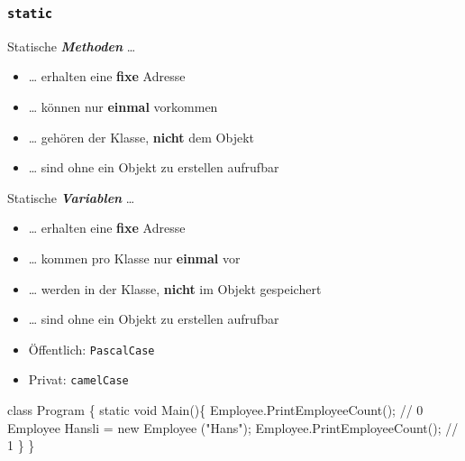 \documentclass[
  9pt,
  a4paperpaper,
  DIV=11]{scrartcl}
\newenvironment{Shaded}{}{}
\newcommand{\CommentTok}[1]{\textcolor[rgb]{0.42,0.45,0.49}{#1}}
\newcommand{\DataTypeTok}[1]{\textcolor[rgb]{0.84,0.23,0.29}{#1}}
\newcommand{\FunctionTok}[1]{\textcolor[rgb]{0.44,0.26,0.76}{#1}}
\newcommand{\KeywordTok}[1]{\textcolor[rgb]{0.84,0.23,0.29}{#1}}
\newcommand{\NormalTok}[1]{\textcolor[rgb]{0.14,0.16,0.18}{#1}}
\newcommand{\OperatorTok}[1]{\textcolor[rgb]{0.14,0.16,0.18}{#1}}
\newcommand{\StringTok}[1]{\textcolor[rgb]{0.01,0.18,0.38}{#1}}
\providecommand{\tightlist}{%
  \setlength{\itemsep}{0pt}\setlength{\parskip}{0pt}}\usepackage{longtable,booktabs,array}
\numberwithin{equation}{section}
\begin{document}
\begin{multicols}{2}
\hypertarget{static}{%
\subsubsection{\texorpdfstring{\texttt{static}}{static}}\label{static}}

Statische \textbf{\emph{Methoden}} \ldots{}

\begin{itemize}
\tightlist
\item
  \ldots{} erhalten eine \textbf{fixe} Adresse
\item
  \ldots{} können nur \textbf{einmal} vorkommen
\item
  \ldots{} gehören der Klasse, \textbf{nicht} dem Objekt
\item
  \ldots{} sind ohne ein Objekt zu erstellen aufrufbar
\end{itemize}

Statische \textbf{\emph{Variablen}} \ldots{}

\begin{itemize}
\tightlist
\item
  \ldots{} erhalten eine \textbf{fixe} Adresse
\item
  \ldots{} kommen pro Klasse nur \textbf{einmal} vor
\item
  \ldots{} werden in der Klasse, \textbf{nicht} im Objekt gespeichert
\item
  \ldots{} sind ohne ein Objekt zu erstellen aufrufbar
\end{itemize}

\begin{tcolorbox}[enhanced jigsaw, colback=white, toptitle=1mm, coltitle=black, left=2mm, opacityback=0, leftrule=.75mm, colbacktitle=quarto-callout-caution-color!10!white, title=\textcolor{quarto-callout-caution-color}{\faFire}\hspace{0.5em}{Namensgebung}, breakable, bottomrule=.15mm, bottomtitle=1mm, titlerule=0mm, toprule=.15mm, rightrule=.15mm, colframe=quarto-callout-caution-color-frame, arc=.35mm, opacitybacktitle=0.6]

\begin{itemize}
\tightlist
\item
  Öffentlich: \texttt{PascalCase}
\item
  Privat: \texttt{camelCase}
\end{itemize}

\end{tcolorbox}

\begin{Shaded}
\begin{Highlighting}[]
\KeywordTok{class}\NormalTok{ Program }\OperatorTok{\{}
  \KeywordTok{static} \DataTypeTok{void} \FunctionTok{Main}\OperatorTok{()\{}
\NormalTok{    Employee}\OperatorTok{.}\FunctionTok{PrintEmployeeCount}\OperatorTok{();}  \CommentTok{// 0}
\NormalTok{    Employee Hansli }\OperatorTok{=} \KeywordTok{new} \FunctionTok{Employee} \OperatorTok{(}\StringTok{"Hans"}\OperatorTok{);}
\NormalTok{    Employee}\OperatorTok{.}\FunctionTok{PrintEmployeeCount}\OperatorTok{();}  \CommentTok{// 1}
  \OperatorTok{\}}
\OperatorTok{\}}


\end{Highlighting}
\end{Shaded}
\end{multicols}
\end{document}
